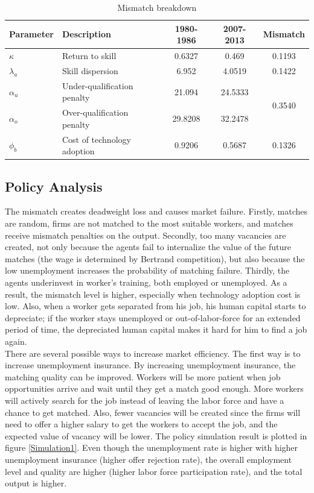 \documentclass[12pt]{article}
\newcommand{\1}{\mathbb{1}}
\begin{document}
\begin{table}[h!]
\centering
\begin{tabular}{ll|ccc}
\hline \hline
Parameter     &       Description         & 1980-1986     & 2007-2013   & Mismatch             \\
\hline 
$\kappa$ & Return to skill & 0.6327  & 0.469 & 0.1193 \\
$\lambda_a$ & Skill dispersion & 6.952   & 4.0519 &  0.1422 \\ 
$\alpha_u$ & Under-qualification penalty & 21.094  & 24.5333 & \multirow{2}{*}{0.3540}\\
$\alpha_o$ & Over-qualification penalty & 29.8208 & 32.2478 \\
$\phi_{b}$ & Cost of technology adoption & 0.9206  & 0.5687 & 0.1326 \\
\hline 
\end{tabular}
\caption{Mismatch breakdown}
\label{Breakdown}
\end{table}

\subsection{Policy Analysis}
The mismatch creates deadweight loss and causes market failure. Firstly, matches are random, firms are not matched to the most suitable workers, and matches receive mismatch penalties on the output. Secondly, too many vacancies are created, not only because the agents fail to internalize the value of the future matches (the wage is determined by Bertrand competition), but also because the low unemployment increases the probability of matching failure. Thirdly, the agents underinvest in worker's training, both employed or unemployed. As a result, the mismatch level is higher, especially when technology adoption cost is low. Also, when a worker gets separated from his job, his human capital starts to depreciate; if the worker stays unemployed or out-of-labor-force for an extended period of time, the depreciated human capital makes it hard for him to find a job again.  \\

There are several possible ways to increase market efficiency. The first way is to increase unemployment insurance. By increasing unemployment insurance, the matching quality can be improved. Workers will be more patient when job opportunities arrive and wait until they get a match good enough. More workers will actively search for the job instead of leaving the labor force and have a chance to get matched. Also, fewer vacancies will be created since the firms will need to offer a higher salary to get the workers to accept the job, and the expected value of vacancy will be lower. The policy simulation result is plotted in figure \ref{Simulation1}. Even though the unemployment rate is higher with higher unemployment insurance (higher offer rejection rate), the overall employment level and quality are higher (higher labor force participation rate), and the total output is higher.
\end{document}
